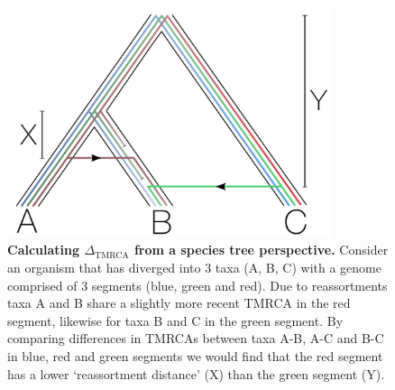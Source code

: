 \documentclass[11pt,oneside,letterpaper]{article}
\newcommand{\dtmrca}{\Delta_\mathrm{TMRCA}}
\begin{document}
\begin{figure}[h]
	\centering	
	\includegraphics[width=0.85\textwidth]{figures/InfB_methodSpeciesTree.pdf}
	\caption{\textbf{Calculating $\dtmrca$ from a species tree perspective.}
Consider an organism that has diverged into 3 taxa (A, B, C) with a genome comprised of 3 segments (blue, green and red).
Due to reassortments taxa A and B share a slightly more recent TMRCA in the red segment, likewise for taxa B and C in the green segment.
By comparing differences in TMRCAs between taxa A-B, A-C and B-C in blue, red and green segments we would find that the red segment has a lower `reassortment distance' (X) than the green segment (Y).
}
	\label{speciesTree}
\end{figure}



\end{document}
